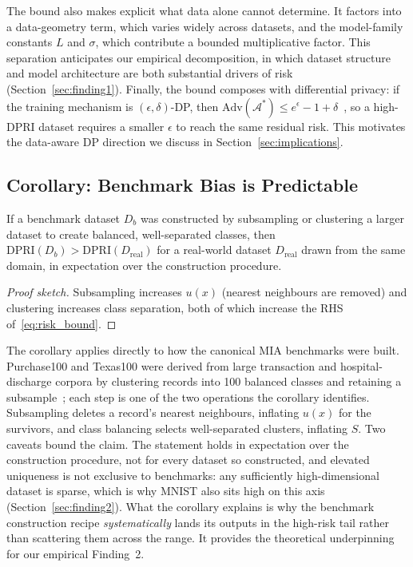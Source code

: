 The bound also makes explicit what data alone cannot determine. It
factors into a data-geometry term, which varies widely across datasets,
and the model-family constants $L$ and $\sigma$, which contribute a
bounded multiplicative factor. This separation anticipates our empirical
decomposition, in which dataset structure and model architecture are
both substantial drivers of risk (Section~\ref{sec:finding1}). Finally,
the bound composes with differential privacy: if the training mechanism
is $(\epsilon,\delta)$-DP, then
$\mathrm{Adv}(\mathcal{A}^*) \leq e^\epsilon - 1 + \delta$~\cite{yeom2018privacy},
so a high-DPRI dataset requires a smaller $\epsilon$ to reach the same
residual risk. This motivates the data-aware DP direction we discuss in
Section~\ref{sec:implications}.

\subsection{Corollary: Benchmark Bias is Predictable}

\begin{corollary}
\label{cor:benchmark}
If a benchmark dataset $D_b$ was constructed by subsampling or clustering
a larger dataset to create balanced, well-separated classes, then
$\mathrm{DPRI}(D_b) > \mathrm{DPRI}(D_{\mathrm{real}})$
for a real-world dataset $D_{\mathrm{real}}$ drawn from the same domain,
in expectation over the construction procedure.
\end{corollary}

\begin{proof}[Proof sketch]
Subsampling increases $u(x)$ (nearest neighbours are removed) and
clustering increases class separation, both of which increase the RHS
of~\eqref{eq:risk_bound}.
\end{proof}

The corollary applies directly to how the canonical MIA benchmarks were
built. Purchase100 and Texas100 were derived from large transaction and
hospital-discharge corpora by clustering records into 100 balanced
classes and retaining a subsample~\cite{shokri2017membership}; each
step is one of the two operations the corollary identifies. Subsampling
deletes a record's nearest neighbours, inflating $u(x)$ for the
survivors, and class balancing selects well-separated clusters,
inflating $S$. Two caveats bound the claim. The statement holds in
expectation over the construction procedure, not for every dataset so
constructed, and elevated uniqueness is not exclusive to benchmarks:
any sufficiently high-dimensional dataset is sparse, which is why MNIST
also sits high on this axis (Section~\ref{sec:finding2}). What the
corollary explains is why the benchmark construction recipe
\emph{systematically} lands its outputs in the high-risk tail rather
than scattering them across the range. It provides the theoretical
underpinning for our empirical Finding~2.
